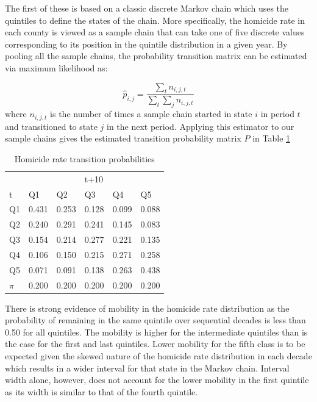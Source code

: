 \documentclass[11pt, titlepage]{article}
\begin{document}
The first of these is based on a classic discrete Markov chain which
uses the quintiles to define the states of the chain. More specifically,
the homicide rate in each county is viewed as a sample chain that can
take one of five discrete values corresponding to its position in the
quintile distribution in a given year. By pooling all the sample chains,
the probability transition matrix can be estimated via maximum
likelihood as:

\begin{equation}
\hat{p}_{i,j} = \frac{\sum_t n_{i,j,t}}{\sum_t \sum_j n_{i,j,t}} 
\label{e:cm}
\end{equation}
where $n_{i,j,t}$ is the number of times a sample chain started in state $i$
in period $t$ and transitioned to state $j$ in the next period. Applying this estimator
to our sample chains gives the  estimated transition
probability matrix $P$ in Table \ref{t:cm}

\begin{table}
  \centering
  \small
\begin{tabular}{|l|lllll|}\hline
   &  &  &t+10& & \\
  t&Q1&Q2&Q3&Q4&Q5\\
  \hline
   Q1& 0.431&0.253&0.128&0.099&0.088\\
   Q2& 0.240&0.291&0.241&0.145&0.083\\
   Q3& 0.154&0.214&0.277&0.221&0.135\\
   Q4& 0.106&0.150&0.215&0.271&0.258\\
   Q5& 0.071&0.091&0.138&0.263&0.438\\
    \hline
    $\pi$&0.200&0.200&0.200&0.200&0.200\\
    \hline
\end{tabular}
\caption{Homicide rate transition probabilities}
\label{t:cm}
\end{table}

There is strong evidence of mobility in the homicide rate distribution
as the probability of remaining in the same quintile over sequential
decades is less than 0.50 for all quintiles. The mobility is higher for
the intermediate quintiles than is the case for the first and last
quintiles. Lower mobility for the fifth class is to be expected given
the skewed nature of the homicide rate distribution in each decade which
results in a wider interval for that state in the Markov chain. Interval
width alone, however, does not account for the lower mobility in the
first quintile as its width is similar to that of the fourth quintile.
\end{document}
